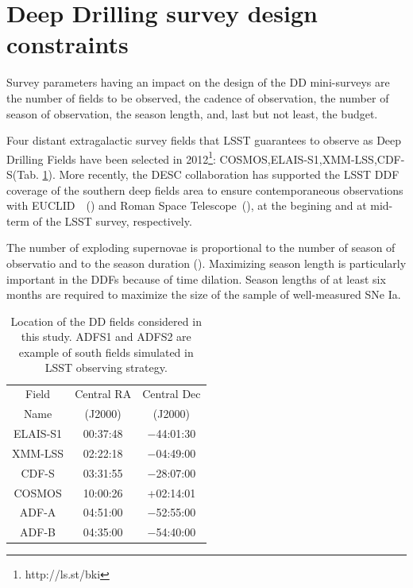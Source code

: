 \documentclass[\docopts]{\docclass}
\newcommand{\cosmos}{{\sc COSMOS}}
\newcommand{\elais}{{\sc ELAIS-S1}}
\newcommand{\xmm}{{\sc XMM-LSS}}
\newcommand{\cdfs}{{\sc CDF-S}}
\newcommand{\adfa}{{\sc ADF-A}}
\newcommand{\adfb}{{\sc ADF-B}}
\newcommand{\euclid}{{\sc EUCLID}}
\newcommand{\romanspace}{{\sc Roman Space Telescope}}
\newcommand{\sne}{{SNe Ia}}
\begin{document}
\section{Deep Drilling survey design constraints}
\label{sec:design}
Survey parameters having an impact on the design of the DD mini-surveys are the number of fields to be observed, the cadence of observation, the number of season of observation, the season length, and, last but not least, the budget.
\par
Four distant extragalactic survey fields that LSST guarantees to observe as Deep Drilling Fields have been selected in 2012\footnote{http://ls.st/bki}: \cosmos,\elais,\xmm,\cdfs (Tab. \ref{tab:locddf}). More recently, the DESC collaboration has supported the LSST DDF coverage of the southern deep fields area to ensure contemporaneous observations with \euclid~~(\citealt{laureijs2011euclid,Amendola_2013}) and \romanspace~(\citealt{spergel2015widefield}), at the begining and at mid-term of the LSST survey, respectively.
\par
The number of exploding supernovae is proportional to the number of season of observatio and to the season duration (\citealt{perrett}). Maximizing season length is particularly important in the DDFs because of time dilation. Season lengths of at least six months are required to maximize the size of the sample of well-measured \sne.
\begin{table}[!htbp]
  \caption{Location of the DD fields considered in this study. ADFS1 and ADFS2 are example of south fields simulated in LSST observing strategy.}\label{tab:locddf}
  \begin{center}
    \begin{tabular}{c|c|c}
      \hline
      \hline
      Field & Central RA & Central Dec\\ 
      Name & (J2000)  & (J2000)\\
      \hline
     \elais & 00:37:48 & −44:01:30 \\
     \xmm & 02:22:18 &  −04:49:00 \\
     \cdfs & 03:31:55 & −28:07:00 \\
     \cosmos &10:00:26 & +02:14:01 \\
     \hline 
     \adfa & 04:51:00& −52:55:00 \\
     \adfb & 04:35:00 & −54:40:00 \\
      \hline
      \hline
      \end{tabular}
  \end{center}
\end{table}
\end{document}

